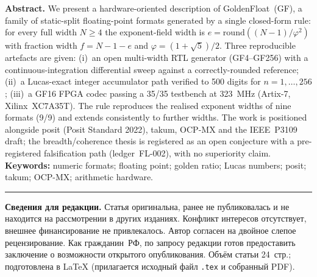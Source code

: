 \documentclass[12pt,a4paper]{article}
\begin{document}
\vspace{0.3cm}
\textbf{Abstract.}
We present a hardware-oriented description of GoldenFloat~(GF), a family of static-split floating-point formats generated by a single closed-form rule: for every full width \(N\ge 4\) the exponent-field width is \(e=\mathrm{round}((N-1)/\varphi^{2})\) with fraction width \(f=N-1-e\) and \(\varphi=(1+\sqrt5)/2\). Three reproducible artefacts are given: (i)~an open multi-width RTL generator (GF4--GF256) with a continuous-integration differential sweep against a correctly-rounded reference; (ii)~a Lucas-exact integer accumulator path verified to 500 digits for \(n=1,\dots,256\); (iii)~a GF16 FPGA codec passing a 35/35 testbench at 323~MHz (Artix-7, Xilinx~XC7A35T). The rule reproduces the realised exponent widths of nine formats (9/9) and extends consistently to further widths. The work is positioned alongside posit (Posit Standard 2022), takum, OCP-MX and the IEEE~P3109 draft; the breadth/coherence thesis is registered as an open conjecture with a pre-registered falsification path (ledger~FL-002), with no superiority claim.\\[6pt]
\textbf{Keywords:} numeric formats; floating point; golden ratio; Lucas numbers; posit; takum; OCP-MX; arithmetic hardware.

\vspace{0.6cm}
\hrule
\vspace{0.4cm}
\small
\textbf{Сведения для редакции.} Статья оригинальна, ранее не публиковалась и не находится на рассмотрении в других изданиях. Конфликт интересов отсутствует, внешнее финансирование не привлекалось. Автор согласен на двойное слепое рецензирование. Как гражданин~РФ, по запросу редакции готов предоставить заключение о возможности открытого опубликования. Объём статьи 24~стр.; подготовлена в \LaTeX{} (прилагается исходный файл \texttt{.tex} и собранный PDF).
\end{document}
